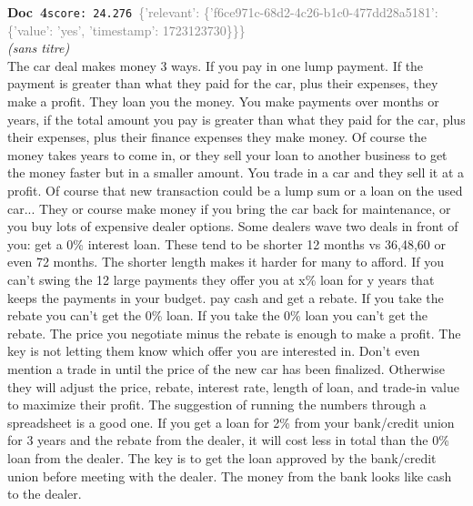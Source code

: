\documentclass[a4paper,11pt]{article}
\begin{document}
\begin{docenv}
{\footnotesize\textcolor{doccolor}{\textbf{Doc~4}}}\hfill{\tiny\texttt{score:~24.276}}\ {\tiny\textcolor{gray}{\{'relevant': \{'f6ce971c-68d2-4c26-b1c0-477dd28a5181': \{'value': 'yes', 'timestamp': 1723123730\}\}\}}}\\[3pt]
{\small\textit{(sans titre)}}\\[2pt]
\vspace{2pt}
{\footnotesize 
The car deal makes money 3 ways. If you pay in one lump payment. If the payment is greater than what they paid for the car, plus their expenses, they make a profit. They loan you the money. You make payments over months or years, if the total amount you pay is greater than what they paid for the car, plus their expenses, plus their finance expenses they make money. Of course the money takes years to come in, or they sell your loan to another business to get the money faster but in a smaller amount. You trade in a car and they sell it at a profit. Of course that new transaction could be a lump sum or a loan on the used car... They or course make money if you bring the car back for maintenance, or you buy lots of expensive dealer options. Some dealers wave two deals in front of you: get a 0\% interest loan. These tend to be shorter 12 months vs 36,48,60 or even 72 months. The shorter length makes it harder for many to afford. If you can't swing the 12 large payments they offer you at x\% loan for y years that keeps the payments in your budget. pay cash and get a rebate. If you take the rebate you can't get the 0\% loan. If you take the 0\% loan you can't get the rebate. The price you negotiate minus the rebate is enough to make a profit. The key is not letting them know which offer you are interested in. Don't even mention a trade in until the price of the new car has been finalized. Otherwise they will adjust the price, rebate, interest rate, length of loan,  and trade-in value to maximize their profit. The suggestion of running the numbers through a spreadsheet is a good one. If you get a loan for 2\% from your bank/credit union for 3 years and the rebate from the dealer, it will cost less in total than the 0\% loan from the dealer. The key is to get the loan approved by the bank/credit union before meeting with the dealer. The money from the bank looks like cash to the dealer.}
\end{docenv}
\end{document}
